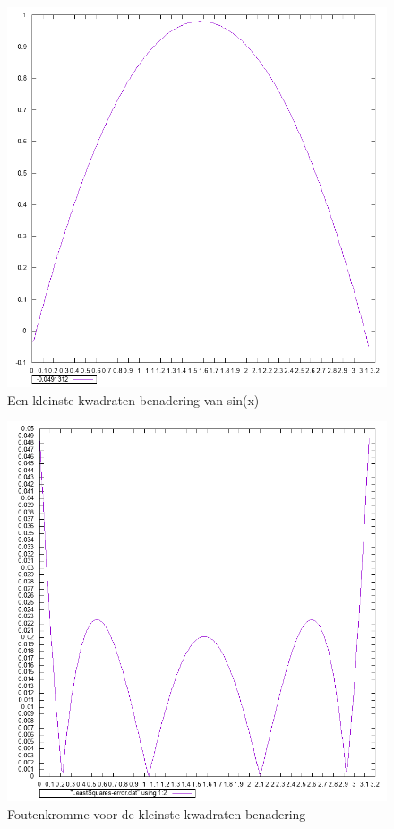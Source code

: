 \documentclass[10pt,a4paper]{article}
\begin{document}
\begin{figure}[H]
\centering
\includegraphics[scale=0.42]{../Onegraphs/LeastSquares-Interpolated.png}
\caption{Een kleinste kwadraten benadering van sin(x)}
\end{figure}
\begin{figure}[H]
\centering
\includegraphics[scale= 0.42]{../Onegraphs/LeastSquares-Error.png}
\caption{Foutenkromme voor de kleinste kwadraten benadering}
\end{figure}
\end{document}

